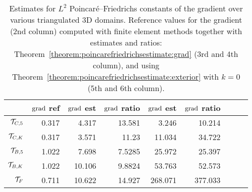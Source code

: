 \documentclass[10pt,a4paper]{article}
\begin{document}
\begin{table}[t]
    \color{red}
    \centering
    \begin{tabular}{|r||r|r|r|r|r||r|r|r|}
        \hline
                        & $\operatorname{grad}$ ref  & $\operatorname{grad}$ est  & $\operatorname{grad}$ ratio       & $\operatorname{grad}$ est  & $\operatorname{grad}$ ratio  \\
        \hline
        ${\mathcal T}_{C,5}$   & 0.317        & 4.317        & 13.581              & 3.246        & 10.214         \\
        \hline
        ${\mathcal T}_{C,K}$   & 0.317        & 3.571        &  11.23              & 11.034       & 34.722         \\
        \hline
        ${\mathcal T}_{B,5}$   & 1.022        & 7.698        & 7.5285              & 25.972       & 25.397         \\
        \hline
        ${\mathcal T}_{B,K}$   & 1.022        & 10.106       & 9.8824              & 53.763       & 52.573         \\
        \hline
        ${\mathcal T}_{F}$     & 0.711        & 10.622       & 14.927              &  268.071     & 377.033        \\ 
        \hline
    \end{tabular} 
    \caption{
    Estimates for $L^2$ Poincar\'e--Friedrichs constants of the gradient over various triangulated 3D domains.
    Reference values for the gradient (2nd column) computed with finite element methods together with estimates and ratios: 
    Theorem~\ref{theorem:poincarefriedrichsestimate:grad} (3rd and 4th column), and using Theorem~\ref{theorem:poincarefriedrichsestimate:exterior} with $k=0$ (5th and 6th column).
    }\label{table:estimates3D:grad}
\end{table}
  
\end{document}
